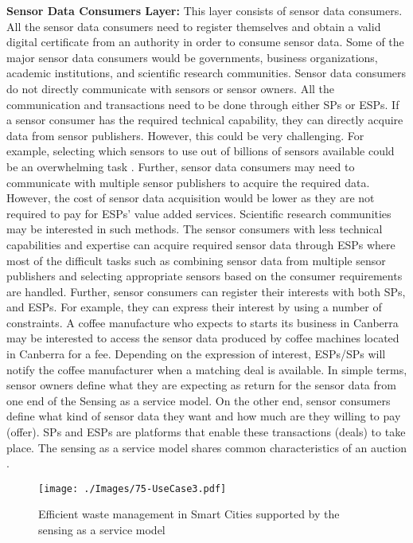 \documentclass[times]{ettauth}
\begin{document}
\textbf{Sensor Data Consumers Layer:} This layer consists of sensor data consumers. All the sensor data consumers need to register themselves and obtain a valid digital certificate from an authority in order to consume sensor data. Some of the major sensor data consumers would be governments, business organizations, academic institutions, and scientific research communities. Sensor data consumers do not directly communicate with sensors or sensor owners. All the communication and  transactions need to be done through either SPs or ESPs. If a sensor consumer has the required technical capability, they can directly acquire data from sensor publishers. However, this could be very challenging. For example, selecting which sensors to use out of billions of sensors available could be an overwhelming task \cite{ZMP006}. Further, sensor data consumers may need to communicate with multiple sensor publishers to acquire the required data. However, the cost of sensor data acquisition would be lower as they are not required to pay for ESPs' value added services. Scientific research communities may be interested in such methods. The sensor consumers with less technical capabilities and expertise can acquire required sensor data through ESPs where most of the difficult tasks such as combining sensor data from multiple sensor publishers and selecting appropriate sensors based on the consumer requirements are handled. Further, sensor consumers can register their interests with both SPs, and ESPs. For example, they can express their interest by using a number of constraints. A coffee manufacture who expects to starts its business in Canberra may be interested to access the sensor data produced by coffee machines located in Canberra for a fee. Depending on the expression of interest, ESPs/SPs will notify the coffee manufacturer when a matching deal is available. In simple terms, sensor owners define what they are expecting as return for the sensor data from one end of the Sensing as a service model. On the other end, sensor consumers define what kind of sensor data they want and how much are they willing to pay (offer). SPs and ESPs are platforms that enable these transactions (deals) to take place. The sensing as a service model shares common characteristics of an auction \cite{P671}.


\begin{figure*}[t]
 \centering
\texttt{[image: ./Images/75-UseCase3.pdf]}
\caption{Efficient waste management in Smart Cities supported by the sensing as a service model}
 \label{Figure:UseCase3}	
\vspace{-6pt}
\end{figure*}
\end{document}

